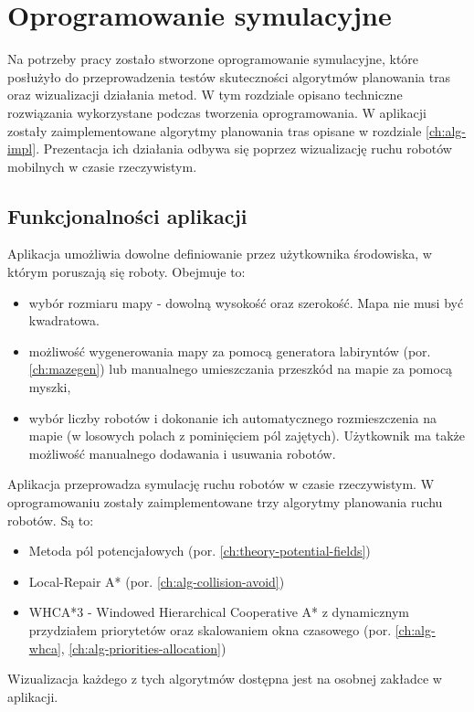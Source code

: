 \chapter{Oprogramowanie symulacyjne}
\label{ch:simulation-app}

Na potrzeby pracy zostało stworzone oprogramowanie symulacyjne, które posłużyło do przeprowadzenia testów skuteczności algorytmów planowania tras oraz wizualizacji działania metod.
W tym rozdziale opisano techniczne rozwiązania wykorzystane podczas tworzenia oprogramowania.
W aplikacji zostały zaimplementowane algorytmy planowania tras opisane w rozdziale \ref{ch:alg-impl}.
Prezentacja ich działania odbywa się poprzez wizualizację ruchu robotów mobilnych w czasie rzeczywistym. 

\section{Funkcjonalności aplikacji}
Aplikacja umożliwia dowolne definiowanie przez użytkownika środowiska, w którym poruszają się roboty. Obejmuje to:
\begin{itemize}
	\item wybór rozmiaru mapy - dowolną wysokość oraz szerokość. Mapa nie musi być kwadratowa.
	\item możliwość wygenerowania mapy za pomocą generatora labiryntów (por. \ref{ch:mazegen}) lub manualnego umieszczania przeszkód na mapie za pomocą myszki,
	\item wybór liczby robotów i dokonanie ich automatycznego rozmieszczenia na mapie (w losowych polach z pominięciem pól zajętych). Użytkownik ma także możliwość manualnego dodawania i usuwania robotów.
\end{itemize}

Aplikacja przeprowadza symulację ruchu robotów w czasie rzeczywistym. W oprogramowaniu zostały zaimplementowane trzy algorytmy planowania ruchu robotów. Są to:
\begin{itemize}
	\item Metoda pól potencjałowych (por. \ref{ch:theory-potential-fields})
	\item Local-Repair A* (por. \ref{ch:alg-collision-avoid})
	\item WHCA*3 - Windowed Hierarchical Cooperative A* z dynamicznym przydziałem priorytetów oraz skalowaniem okna czasowego (por. \ref{ch:alg-whca}, \ref{ch:alg-priorities-allocation})
\end{itemize}
Wizualizacja każdego z tych algorytmów dostępna jest na osobnej zakładce w aplikacji.
